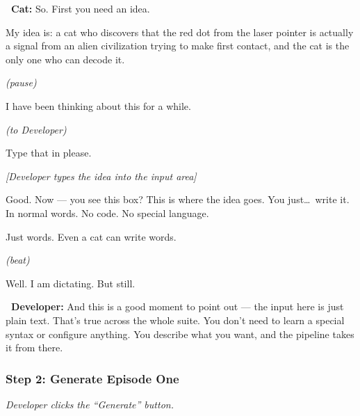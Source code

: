 \documentclass[12pt, letterpaper]{article}
\newcommand{\dev}{\textbf{\color{cogblue}\faIcon{laptop-code}\ Developer:}}
\newcommand{\cat}{\textbf{\color{catpink}\faIcon{cat}\ Cat:}}
\newcommand{\stage}[1]{%
    \begin{stagebox}%
      \textit{\color{black!60}#1}%
    \end{stagebox}%
  }
\begin{document}
  \begin{catbox}
    \cat{} \large So. First you need an idea.

    \medskip
    {\large My idea is: a cat who discovers that the red dot from the laser pointer
    is actually a signal from an alien civilization trying to make first contact,
    and the cat is the only one who can decode it.}

    \medskip
    {\large\textit{(pause)}}

    \medskip
    {\large I have been thinking about this for a while.}

    \medskip
    {\large\textit{(to Developer)}}

    \medskip
    {\large Type that in please.}

    \medskip
    {\large\textit{[Developer types the idea into the input area]}}

    \medskip
    {\large Good. Now — you see this box? This is where the idea goes. You
    just\ldots\ write it. In normal words. No code. No special language.}

    \medskip
    {\large Just words. Even a cat can write words.}

    \medskip
    {\large\textit{(beat)}}

    \medskip
    {\large Well. I am dictating. But still.}
  \end{catbox}

  \begin{developerbox}
    \dev{} And this is a good moment to point out — the input here is just plain
    text. That's true across the whole suite. You don't need to learn a special
    syntax or configure anything. You describe what you want, and the pipeline
    takes it from there.
  \end{developerbox}

  \subsubsection{Step 2: Generate Episode One}

  \stage{Developer clicks the ``Generate'' button.}
\end{document}
